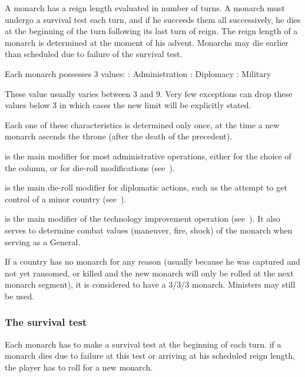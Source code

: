  A monarch has a reign length evaluated in number of
turns. A monarch must undergo a survival test each turn, and if he succeeds
them all successively, he dies at the beginning of the turn following its last
turn of reign. The reign length of a monarch is determined at the moment of
his advent.%
\bparag Monarchs may die earlier than scheduled due to failure of the survival
test.

 Each monarch possesses 3 values:
\bparag \ADM: Administration
\bparag \DIP: Diplomacy
\bparag \MIL: Military

\aparag These value usually varies between 3 and 9. Very few exceptions can
drop these values below 3 in which cases the new limit will be explicitly
stated.

\aparag Each one of these characteristics is determined only once, at the time
a new monarch ascends the throne (after the death of the precedent).

 \ADM is the main modifier for most
administrative operations, either for the choice of the column, or for
die-roll modifications (see~).

 \DIP is the main die-roll modifier for diplomatic
actions, such as the attempt to get control of a minor country
(see~).

 \MIL is the main modifier of the technology
improvement operation (see~). It also serves to determine combat values (maneuver, fire,
shock) of the monarch when serving as a General.

\aparag[No monarch] If a country has no monarch for any reason (usually
because he was captured and not yet ransomed, or killed and the new monarch
will only be rolled at the next monarch segment), it is considered to have a
3/3/3 monarch.
\bparag Ministers may still be used.

\subsubsection{The survival test}
\aparag Each monarch has to make a survival test at the beginning of each
turn.
\bparag if a monarch dies due to failure at this test or arriving at his
scheduled reign length, the player has to roll for a new monarch.

